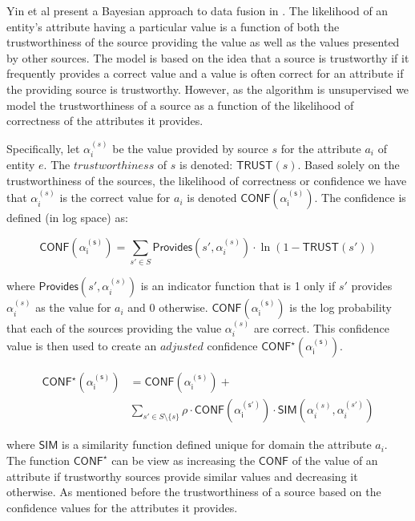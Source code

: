 \documentclass{acm_proc_article-sp}
\begin{document}
Yin et al present a Bayesian approach to data fusion in \cite{yin:truth}.  The likelihood of an entity's attribute having a particular value is a function of both the trustworthiness of the source providing the value as well as the values presented by other sources. The model is based on the idea that a source is trustworthy if it frequently provides a correct value and a value is often correct for an attribute if the providing source is trustworthy. However, as the algorithm is unsupervised we model the trustworthiness of a source as a function of the likelihood of correctness of the attributes it provides. 

Specifically, let $\alpha_i^{(s)}$ be the value provided by source $s$ for the attribute $a_i$ of entity $e$. The $trustworthiness$ of $s$ is denoted: $\mathsf{TRUST}(s)$. Based solely on the trustworthiness of the sources, the likelihood of correctness or confidence we have that $\alpha_i^{(s)}$ is the correct value for $a_i$ is denoted $\mathsf{CONF(\alpha_i^{(s)})}$.  The confidence is defined (in log space) as:

\begin{equation}
\mathsf{CONF(\alpha_i^{(s)})} = \sum_{s' \in S} \mathsf{Provides}(s',\alpha_i^{(s)}) \cdot \ln(1-\mathsf{TRUST}(s'))
\end{equation}

where $\mathsf{Provides}(s',\alpha_i^{(s)})$ is an indicator function that is 1 only if $s'$ provides $\alpha_i^{(s)}$ as the value for $a_i$ and 0 otherwise. $\mathsf{CONF(\alpha_i^{(s)})}$ is the log probability that each of the sources providing the value $\alpha_i^{(s)}$ are correct. This confidence value is then used to create an $adjusted$ confidence $\mathsf{CONF^\star(\alpha_i^{(s)})}$.

\begin{align}
\mathsf{CONF^\star(\alpha_i^{(s)})} &= \mathsf{CONF(\alpha_i^{(s)})} + \\ \nonumber
&  \sum_{s' \in S \setminus \{s\}} \rho \cdot \mathsf{CONF(\alpha_i^{(s')})}  \cdot \mathsf{SIM}(\alpha_i^{(s)},\alpha_i^{(s')})
\end{align}

where $\mathsf{SIM}$ is a similarity function defined unique for domain the attribute $a_i$. The function $\mathsf{CONF}^\star$ can be view as increasing  the $\mathsf{CONF}$ of the value of an attribute if trustworthy sources provide similar values and decreasing it otherwise. As mentioned before the trustworthiness of a source based on the confidence values for the attributes it provides. 
\end{document}
